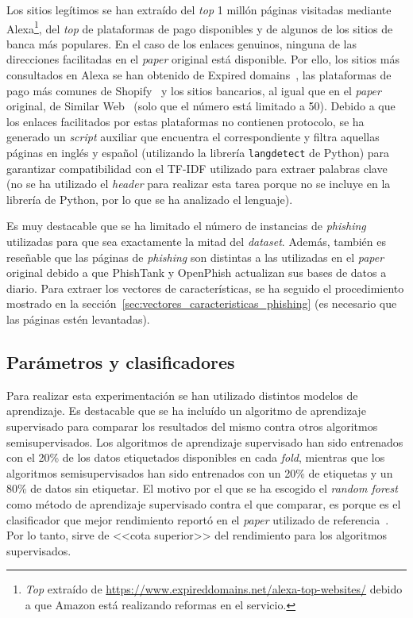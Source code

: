 Los sitios legítimos se han extraído del \textit{top} 1 millón páginas visitadas mediante Alexa\footnote{\textit{Top} extraído de \url{https://www.expireddomains.net/alexa-top-websites/} debido a que Amazon está realizando reformas en el servicio.}, del \textit{top} de plataformas de pago disponibles y de algunos de los sitios de banca más populares. En el caso de los enlaces genuinos, ninguna de las direcciones facilitadas en el \textit{paper} original está disponible. Por ello, los sitios más consultados en Alexa se han obtenido de Expired domains~\cite{AlexaTopWebsites}, las plataformas de pago más comunes de Shopify~\cite{paymentGatewaysWebsites} y los sitios bancarios, al igual que en el \textit{paper} original, de Similar Web~\cite{banksitesTop} (solo que el número está limitado a 50). Debido a que los enlaces facilitados por estas plataformas no contienen protocolo, se ha generado un \textit{script} auxiliar que encuentra el correspondiente y filtra aquellas páginas en inglés y español (utilizando la librería \texttt{langdetect} de Python) para garantizar compatibilidad con el TF-IDF utilizado para extraer palabras clave (no se ha utilizado el \textit{header} para realizar esta tarea porque no se incluye en la librería de Python, por lo que se ha analizado el lenguaje).

Es muy destacable que se ha limitado el número de instancias de \textit{phishing} utilizadas para que sea exactamente la mitad del \textit{dataset}. Además, también es reseñable que las páginas de \textit{phishing} son distintas a las utilizadas en el \textit{paper} original debido a que PhishTank y OpenPhish actualizan sus bases de datos a diario. Para extraer los vectores de características, se ha seguido el procedimiento mostrado en la sección~\ref{sec:vectores_caracteristicas_phishing} (es necesario que las páginas estén levantadas).

\subsection{Parámetros y clasificadores}

Para realizar esta experimentación se han utilizado distintos modelos de aprendizaje. Es destacable que se ha incluído un algoritmo de aprendizaje supervisado para comparar los resultados del mismo contra otros algoritmos semisupervisados. Los algoritmos de aprendizaje supervisado han sido entrenados con el 20\% de los datos etiquetados disponibles en cada \textit{fold}, mientras que los algoritmos semisupervisados han sido entrenados con un 20\% de etiquetas y un 80\% de datos sin etiquetar. El motivo por el que se ha escogido el \textit{random forest} como método de aprendizaje supervisado contra el que comparar, es porque es el clasificador que mejor rendimiento reportó en el \textit{paper} utilizado de referencia~\cite{featuresPhishing2018Gupta}. Por lo tanto, sirve de <<cota superior>> del rendimiento para los algoritmos supervisados.


